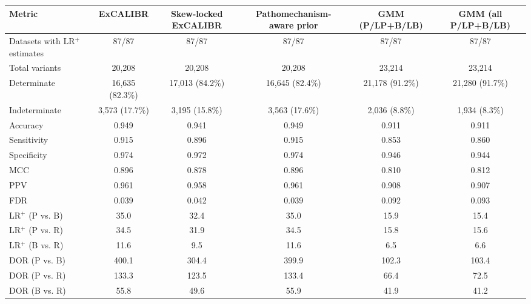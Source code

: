\begin{tabular}{lccccc}
\toprule
Metric & ExCALIBR & Skew-locked ExCALIBR & Pathomechanism-aware prior & GMM (P/LP+B/LB) & GMM (all P/LP+B/LB) \\
\midrule
Datasets with LR$^+$ estimates & 87/87 & 87/87 & 87/87 & 87/87 & 87/87 \\
Total variants & 20,208 & 20,208 & 20,208 & 23,214 & 23,214 \\
Determinate & 16,635 (82.3\%) & 17,013 (84.2\%) & 16,645 (82.4\%) & 21,178 (91.2\%) & 21,280 (91.7\%) \\
Indeterminate & 3,573 (17.7\%) & 3,195 (15.8\%) & 3,563 (17.6\%) & 2,036 (8.8\%) & 1,934 (8.3\%) \\
\midrule
Accuracy & 0.949 & 0.941 & 0.949 & 0.911 & 0.911 \\
Sensitivity & 0.915 & 0.896 & 0.915 & 0.853 & 0.860 \\
Specificity & 0.974 & 0.972 & 0.974 & 0.946 & 0.944 \\
MCC & 0.896 & 0.878 & 0.896 & 0.810 & 0.812 \\
PPV & 0.961 & 0.958 & 0.961 & 0.908 & 0.907 \\
FDR & 0.039 & 0.042 & 0.039 & 0.092 & 0.093 \\
\midrule
LR$^+$ (P vs. B) & 35.0 & 32.4 & 35.0 & 15.9 & 15.4 \\
LR$^+$ (P vs. R) & 34.5 & 31.9 & 34.5 & 15.8 & 15.6 \\
LR$^+$ (B vs. R) & 11.6 & 9.5 & 11.6 & 6.5 & 6.6 \\
DOR (P vs. B) & 400.1 & 304.4 & 399.9 & 102.3 & 103.4 \\
DOR (P vs. R) & 133.3 & 123.5 & 133.4 & 66.4 & 72.5 \\
DOR (B vs. R) & 55.8 & 49.6 & 55.9 & 41.9 & 41.2 \\
\bottomrule
\end{tabular}

